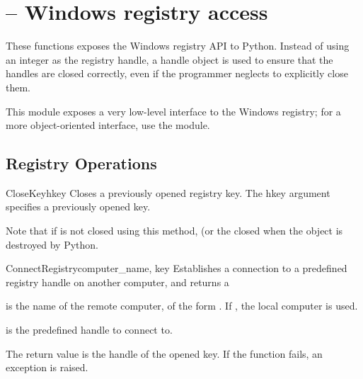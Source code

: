 \section{ --
         Windows registry access}



These functions exposes the Windows registry API to Python.  Instead of
using an integer as the registry handle, a handle object is used to ensure
that the handles are closed correctly, even if the programmer
neglects to explicitly close them.

This module exposes a very low-level interface to the Windows
registry; for a more object-oriented interface, use the
 module.


\subsection{Registry Operations \label{registry-operations}}

\begin{funcdesc}{CloseKey}{hkey}
 Closes a previously opened registry key.
 The hkey argument specifies a previously opened key.

 Note that if  is not closed using this method, (or the
  closed when the  object is 
 destroyed by Python.
\end{funcdesc}


\begin{funcdesc}{ConnectRegistry}{computer_name, key}
  Establishes a connection to a predefined registry handle on 
  another computer, and returns a 

  is the name of the remote computer, of the 
 form .  If , the local computer is 
 used.
 
  is the predefined handle to connect to.

 The return value is the handle of the opened key.
 If the function fails, an  exception is 
 raised.
\end{funcdesc}


